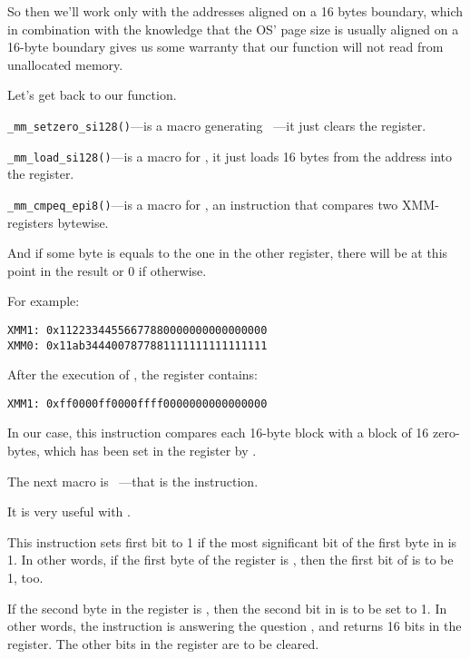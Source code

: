 So then we'll work only with the addresses aligned on a 16 bytes boundary, which in combination with the knowledge
that the \ac{OS}' page size is usually aligned on a 16-byte boundary gives us some warranty that our function will not
read from unallocated memory.

Let's get back to our function.

\verb|_mm_setzero_si128()|---is a macro generating ~---it just clears the  register.

\verb|_mm_load_si128()|---is a macro for \MOVDQA, it just loads 16 bytes from the address into the  register.

\verb|_mm_cmpeq_epi8()|---is a macro for \PCMPEQB, an instruction that compares two XMM-registers bytewise.

And if some byte is equals to the one in the other register, 
there will be  at this point in the result or 0 if otherwise.

For example:

\begin{verbatim}
XMM1: 0x11223344556677880000000000000000
XMM0: 0x11ab3444007877881111111111111111
\end{verbatim}

After the execution of , the  register contains:

\begin{verbatim}
XMM1: 0xff0000ff0000ffff0000000000000000
\end{verbatim}

In our case, this instruction compares each 16-byte block with a block of 16 zero-bytes,
which has been set in the  register by .


The next macro is ~---that is the  instruction.

It is very useful with \PCMPEQB.


This instruction sets first \EAX bit to 1 if the most significant bit of the first byte in  is 1.
In other words, if the first byte of the  register is , then the first bit of \EAX is to be 1, too.

If the second byte in the  register is , then the second bit in \EAX is to be set to 1.
In other words, the instruction is answering the question ,
and returns 16 bits in the \EAX register.
The other bits in the \EAX register are to be cleared.

